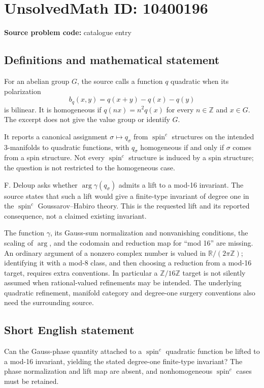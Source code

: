 \documentclass[11pt]{article}
\newcommand{\Z}{\mathbb{Z}}
\newcommand{\R}{\mathbb{R}}
\begin{document}
\section*{UnsolvedMath ID: 10400196}
\textbf{Source problem code:} catalogue entry
\subsection{Definitions and mathematical statement}
For an abelian group \(G\), the source calls a function \(q\) quadratic when its polarization
\[
 b_q(x,y)=q(x+y)-q(x)-q(y)
\]
is bilinear. It is homogeneous if \(q(nx)=n^2q(x)\) for every \(n\in\Z\) and \(x\in G\). The excerpt does not give the value group or identify \(G\).

It reports a canonical assignment \(\sigma\mapsto q_\sigma\) from \(\operatorname{spin}^c\) structures on the intended 3-manifolds to quadratic functions, with \(q_\sigma\) homogeneous if and only if \(\sigma\) comes from a spin structure. Not every \(\operatorname{spin}^c\) structure is induced by a spin structure; the question is not restricted to the homogeneous case.

F. Deloup asks whether \(\arg\gamma(q_\sigma)\) admits a lift to a mod-16 invariant. The source states that such a lift would give a finite-type invariant of degree one in the \(\operatorname{spin}^c\) Goussarov--Habiro theory. This is the requested lift and its reported consequence, not a claimed existing invariant.

The function \(\gamma\), its Gauss-sum normalization and nonvanishing conditions, the scaling of \(\arg\), and the codomain and reduction map for ``mod 16'' are missing. An ordinary argument of a nonzero complex number is valued in \(\R/(2\pi\Z)\); identifying it with a mod-8 class, and then choosing a reduction from a mod-16 target, requires extra conventions. In particular a \(\Z/16\Z\) target is not silently assumed when rational-valued refinements may be intended. The underlying quadratic refinement, manifold category and degree-one surgery conventions also need the surrounding source.
\subsection{Short English statement}
Can the Gauss-phase quantity attached to a \(\operatorname{spin}^c\) quadratic function be lifted to a mod-16 invariant, yielding the stated degree-one finite-type invariant? The phase normalization and lift map are absent, and nonhomogeneous \(\operatorname{spin}^c\) cases must be retained.
\end{document}
